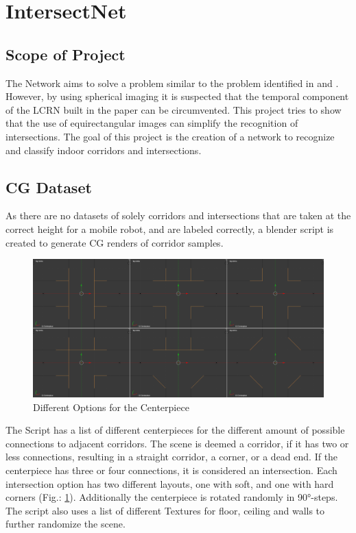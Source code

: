 \documentclass[sigconf]{acmart}
\begin{document}
\section{IntersectNet}
\subsection{Scope of Project}
The Network aims to solve a problem similar to the problem identified in \cite{IntersectNet} and \citep{E2ENavigation}.
However, by using spherical imaging it is suspected that the temporal component of the LCRN built in the paper can be circumvented.
This project tries to show that the use of equirectangular images can simplify the recognition of intersections.
The goal of this project is the creation of a network to recognize and classify indoor corridors and intersections.

\subsection{CG Dataset}
As there are no datasets of solely corridors and intersections that are taken at the correct height for a mobile robot, and are labeled correctly, a blender script is created to generate CG renders of corridor samples.

\begin{figure}[h]
  \centering
  \includegraphics[width=\linewidth]{Blender_Schematic_Combined}
  \caption{Different Options for the Centerpiece}
  \label{fig:Centerpiece}
\end{figure}

The Script has a list of different centerpieces for the different amount of possible connections to adjacent corridors.
The scene is deemed a corridor, if it has two or less connections, resulting in a straight corridor, a corner, or a dead end.
If the centerpiece has three or four connections, it is considered an intersection.
Each intersection option has two different layouts, one with soft, and one with hard corners (Fig.: \ref{fig:Centerpiece}).
Additionally the centerpiece is rotated randomly in 90°-steps.
The script also uses a list of different Textures for floor, ceiling and walls to further randomize the scene.
\end{document}
